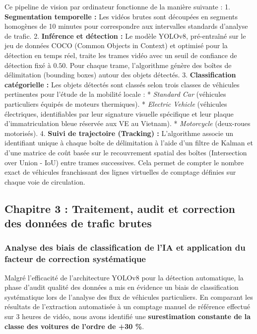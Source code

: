 \documentclass[10pt, a4paper]{article}
\begin{document}
Ce pipeline de vision par ordinateur fonctionne de la manière suivante :
1. \textbf{Segmentation temporelle :} Les vidéos brutes sont découpées
en segments homogènes de 10 minutes pour correspondre aux intervalles
standards d'analyse de trafic. 2. \textbf{Inférence et détection :} Le
modèle YOLOv8, pré-entraîné sur le jeu de données COCO (Common Objects
in Context) et optimisé pour la détection en temps réel, traite les
trames vidéo avec un seuil de confiance de détection fixé à \(0.50\).
Pour chaque trame, l'algorithme génère des boîtes de délimitation
(bounding boxes) autour des objets détectés. 3. \textbf{Classification
catégorielle :} Les objets détectés sont classés selon trois classes de
véhicules pertinentes pour l'étude de la mobilité locale : *
\emph{Standard Car} (véhicules particuliers équipés de moteurs
thermiques). * \emph{Electric Vehicle} (véhicules électriques,
identifiables par leur signature visuelle spécifique et leur plaque
d'immatriculation bleue réservée aux VE au Vietnam). * \emph{Motorcycle}
(deux-roues motorisés). 4. \textbf{Suivi de trajectoire (Tracking) :}
L'algorithme associe un identifiant unique à chaque boîte de
délimitation à l'aide d'un filtre de Kalman et d'une matrice de coût
basée sur le recouvrement spatial des boîtes (Intersection over Union -
IoU) entre trames successives. Cela permet de compter le nombre exact de
véhicules franchissant des lignes virtuelles de comptage définies sur
chaque voie de circulation.

\newpage

\subsection{Chapitre 3 : Traitement, audit et correction des données de
trafic
brutes}\label{chapitre-3-traitement-audit-et-correction-des-donnuxe9es-de-trafic-brutes}

\subsubsection{Analyse des biais de classification de l'IA et
application du facteur de correction
systématique}\label{analyse-des-biais-de-classification-de-lia-et-application-du-facteur-de-correction-systuxe9matique}

Malgré l'efficacité de l'architecture YOLOv8 pour la détection
automatique, la phase d'audit qualité des données a mis en évidence un
biais de classification systématique lors de l'analyse des flux de
véhicules particuliers. En comparant les résultats de l'extraction
automatisée à un comptage manuel de référence effectué sur 3 heures de
vidéo, nous avons identifié une \textbf{surestimation constante de la
classe des voitures de l'ordre de +30 \%}.
\end{document}
